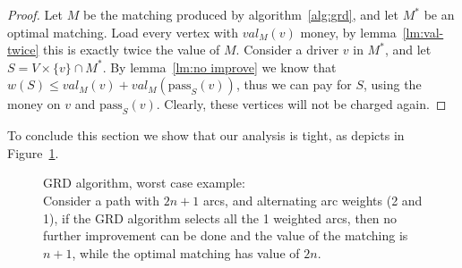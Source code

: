 \begin{proof}
Let $M$ be the matching produced by algorithm~\ref{alg:grd}, 
and let $M^*$ be an optimal matching.
Load every vertex with $val_M(v)$ money, 
by lemma~\ref{lm:val-twice} this is exactly twice the value of $M$.
Consider a driver $v$ in $M^*$, and let $S = V \times \{v\} \cap M^*$.
By lemma~\ref{lm:no improve} we know that $w(S) \leq val_M(v) + val_M(\text{pass}_S(v))$,
thus we can pay for $S$, using the money on $v$ and $\text{pass}_S(v)$.
Clearly, these vertices will not be charged again.
\end{proof}

To conclude this section we show that our analysis is tight, 
as depicts in Figure~\ref{fig:grd worst}.
\begin{figure}
\centering

\caption[]{
\label{fig:grd worst}
GRD algorithm, worst case example: \\
Consider a path with $2n + 1$ arcs,
and alternating arc weights (2 and 1),
if the GRD algorithm selects all the 1 weighted arcs,
then no further improvement can be done and the value of the matching is $n + 1$,
while the optimal matching has value of $2n$.
}
\end{figure}